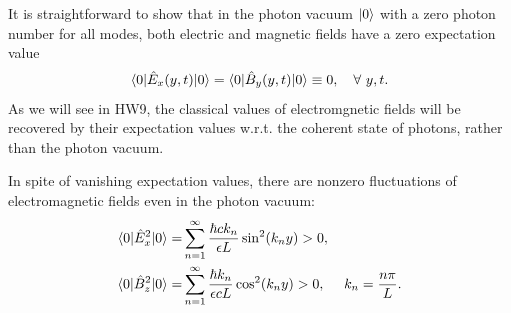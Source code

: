 It is straightforward to show that in the photon vacuum $|{0}\rangle$ with a zero photon number for all modes, both electric and magnetic fields have a zero expectation value
\begin{align}
    \langle{0|\hat E_x(y,t)|0}\rangle=\langle{0|\hat B_y(y,t)|0}\rangle\equiv0,~~~\forall~y,t.
\end{align}
As we will see in HW9, the classical values of electromgnetic fields will be recovered by their expectation values w.r.t. the coherent state of photons, rather than the photon vacuum. 

In spite of vanishing expectation values, there are nonzero fluctuations of electromagnetic fields even in the photon vacuum:
\begin{align}
    \langle{0|\hat E_x^2|0}\rangle=&\sum_{n=1}^\infty\frac{\hbar c k_n}{\epsilon L}\sin^2(k_ny)>0,\\
    \langle{0|\hat B_z^2|0}\rangle=&\sum_{n=1}^\infty\frac{\hbar k_n}{\epsilon cL}\cos^2(k_ny)>0,~~~~k_n=\frac{n\pi}{L}.
\end{align}



